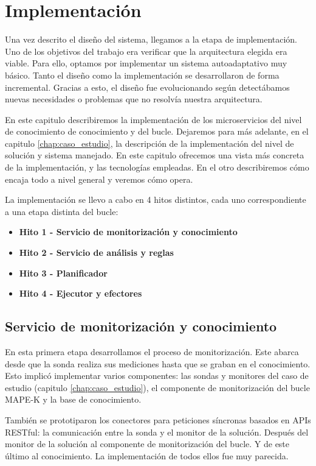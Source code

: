 
\chapter{Implementación}
\label{chap:implementación}

Una vez descrito el diseño del sistema, llegamos a la etapa de implementación. Uno de los objetivos del trabajo era verificar que la arquitectura elegida era viable. Para ello, optamos por implementar un sistema autoadaptativo muy básico. Tanto el diseño como la implementación se desarrollaron de forma incremental. Gracias a esto, el diseño fue evolucionando según detectábamos nuevas necesidades o problemas que no resolvía nuestra arquitectura.

En este capitulo describiremos la implementación de los microservicios del nivel de conocimiento de conocimiento y del bucle. Dejaremos para más adelante, en el capitulo \ref{chap:caso_estudio}, la descripción de la implementación del nivel de solución y sistema manejado. En este capitulo ofrecemos una vista más concreta de la implementación, y las tecnologías empleadas. En el otro describiremos cómo encaja todo a nivel general y veremos cómo opera.

La implementación se llevo a cabo en 4 hitos distintos, cada uno correspondiente a una etapa distinta del bucle:

\begin{itemize}
  \item \textbf{Hito 1 - Servicio de monitorización y conocimiento}
  \item \textbf{Hito 2 - Servicio de análisis y reglas}
  \item \textbf{Hito 3 - Planificador}
  \item \textbf{Hito 4 - Ejecutor y efectores}
\end{itemize}

\section{Servicio de monitorización y conocimiento}

En esta primera etapa desarrollamos el proceso de monitorización. Este abarca desde que la sonda realiza sus mediciones hasta que se graban en el conocimiento. Esto implicó implementar varios componentes: las sondas y monitores del caso de estudio (capitulo \ref{chap:caso_estudio}), el componente de monitorización del bucle MAPE-K y la base de conocimiento.

También se prototiparon los conectores para peticiones síncronas basados en APIs RESTful: la comunicación entre la sonda y el monitor de la solución. Después del monitor de la solución al componente de monitorización del bucle. Y de este último al conocimiento. La implementación de todos ellos fue muy parecida.

